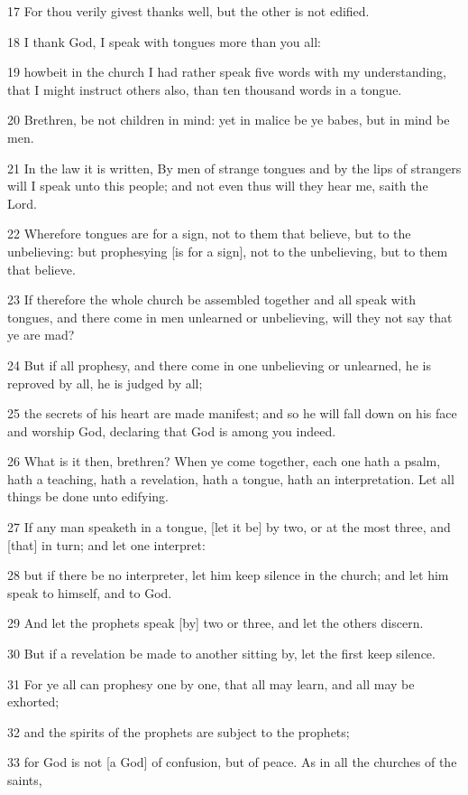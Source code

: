 \par 17 For thou verily givest thanks well, but the other is not edified.
\par 18 I thank God, I speak with tongues more than you all:
\par 19 howbeit in the church I had rather speak five words with my understanding, that I might instruct others also, than ten thousand words in a tongue.
\par 20 Brethren, be not children in mind: yet in malice be ye babes, but in mind be men.
\par 21 In the law it is written, By men of strange tongues and by the lips of strangers will I speak unto this people; and not even thus will they hear me, saith the Lord.
\par 22 Wherefore tongues are for a sign, not to them that believe, but to the unbelieving: but prophesying [is for a sign], not to the unbelieving, but to them that believe.
\par 23 If therefore the whole church be assembled together and all speak with tongues, and there come in men unlearned or unbelieving, will they not say that ye are mad?
\par 24 But if all prophesy, and there come in one unbelieving or unlearned, he is reproved by all, he is judged by all;
\par 25 the secrets of his heart are made manifest; and so he will fall down on his face and worship God, declaring that God is among you indeed.
\par 26 What is it then, brethren? When ye come together, each one hath a psalm, hath a teaching, hath a revelation, hath a tongue, hath an interpretation. Let all things be done unto edifying.
\par 27 If any man speaketh in a tongue, [let it be] by two, or at the most three, and [that] in turn; and let one interpret:
\par 28 but if there be no interpreter, let him keep silence in the church; and let him speak to himself, and to God.
\par 29 And let the prophets speak [by] two or three, and let the others discern.
\par 30 But if a revelation be made to another sitting by, let the first keep silence.
\par 31 For ye all can prophesy one by one, that all may learn, and all may be exhorted;
\par 32 and the spirits of the prophets are subject to the prophets;
\par 33 for God is not [a God] of confusion, but of peace. As in all the churches of the saints,
